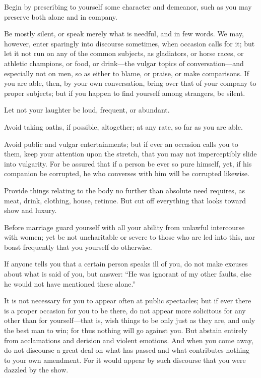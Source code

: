 Begin by prescribing to yourself some character and demeanor, such as you
may preserve both alone and in company.

Be mostly silent, or speak merely what is needful, and in few words. We
may, however, enter sparingly into discourse sometimes, when occasion
calls for it; but let it not run on any of the common subjects, as
gladiators, or horse races, or athletic champions, or food, or drink---the
vulgar topics of conversation---and especially not on men, so as either to
blame, or praise, or make comparisons. If you are able, then, by your own
conversation, bring over that of your company to proper subjects; but if
you happen to find yourself among strangers, be silent.

Let not your laughter be loud, frequent, or abundant.

Avoid taking oaths, if possible, altogether; at any rate, so far as you
are able.

Avoid public and vulgar entertainments; but if ever an occasion calls you
to them, keep your attention upon the stretch, that you may not
imperceptibly slide into vulgarity. For be assured that if a person be
ever so pure himself, yet, if his companion be corrupted, he who
converses with him will be corrupted likewise.

Provide things relating to the body no further than absolute need
requires, as meat, drink, clothing, house, retinue. But cut off
everything that looks toward show and luxury.

Before marriage guard yourself with all your ability from unlawful
intercourse with women; yet be not uncharitable or severe to those who
are led into this, nor boast frequently that you yourself do otherwise.

If anyone tells you that a certain person speaks ill of you, do not make
excuses about what is said of you, but answer: ``He was ignorant of my
other faults, else he would not have mentioned these alone.''

It is not necessary for you to appear often at public spectacles; but if
ever there is a proper occasion for you to be there, do not appear more
solicitous for any other than for yourself---that is, wish things to be
only just as they are, and only the best man to win; for thus nothing
will go against you. But abstain entirely from acclamations and derision
and violent emotions. And when you come away, do not discourse a great
deal on what has passed and what contributes nothing to your own
amendment. For it would appear by such discourse that you were dazzled by
the show.

